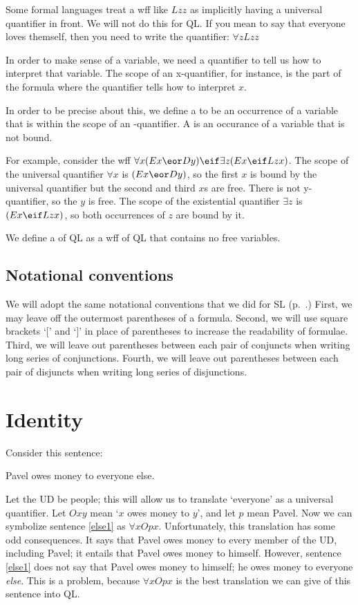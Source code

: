 Some formal languages treat a wff like $Lzz$ as implicitly having a universal quantifier in front. We will not do this for QL. If you mean to say that everyone loves themself, then you need to write the quantifier: $\forall zLzz$

In order to make sense of a variable, we need a quantifier to tell us how to interpret that variable. The scope of an x-quantifier, for instance, is the part of the formula where the quantifier tells how to interpret $x$.

In order to be precise about this, we define a  to be an occurrence of a variable  that is within the scope of an -quantifier. A  is an occurance of a variable that is not bound.

For example, consider the wff $\forall x(Ex \eor Dy) \eif \exists z(Ex \eif Lzx)$. The scope of the universal quantifier $\forall x$ is $(Ex \eor Dy)$, so the first $x$ is bound by the universal quantifier but the second and third $x$s are free. There is not y-quantifier, so the $y$ is free. The scope of the existential quantifier $\exists z$ is $(Ex \eif Lzx)$, so both occurrences of $z$ are bound by it.

We define a  of QL as a wff of QL that contains no free variables.



\subsection{Notational conventions}

We will adopt the same notational conventions that we did for SL (p.~\pageref{SLconventions}.) First, we may leave off the outermost parentheses of a formula. Second, we will use square brackets `[' and `]' in place of parentheses to increase the readability of formulae. Third, we will leave out parentheses between each pair of conjuncts when writing long series of conjunctions. Fourth, we will leave out parentheses between each pair of disjuncts when writing long series of disjunctions.


\section{Identity}
\label{sec.identity}

Consider this sentence:
\begin{earg}
\item[\ex{else1}] Pavel owes money to everyone else.
\end{earg}
Let the UD be people; this will allow us to translate `everyone' as a universal quantifier. Let $Oxy$ mean `$x$ owes money to $y$', and let $p$ mean Pavel. Now we can symbolize sentence \ref{else1} as $\forall x Opx$. Unfortunately, this translation has some odd consequences. It says that Pavel owes money to every member of the UD, including Pavel; it entails that Pavel owes money to himself. However, sentence \ref{else1} does not say that Pavel owes money to himself; he owes money to everyone \emph{else}. This is a problem, because $\forall x Opx$ is the best translation we can give of this sentence into QL.

